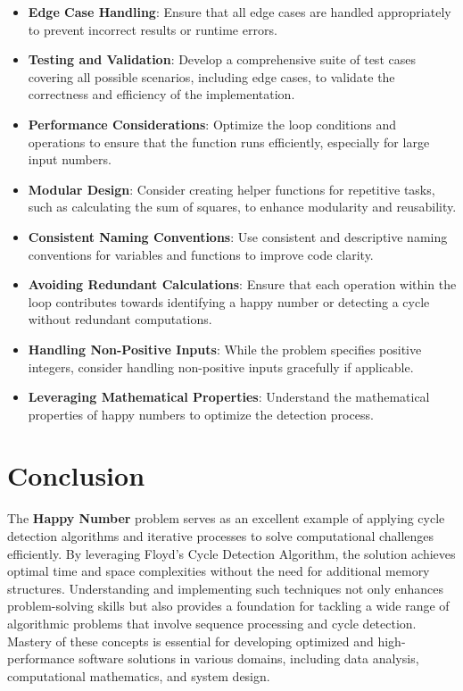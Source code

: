 \begin{itemize}
    \item \textbf{Edge Case Handling}: Ensure that all edge cases are handled appropriately to prevent incorrect results or runtime errors.
    
    \item \textbf{Testing and Validation}: Develop a comprehensive suite of test cases covering all possible scenarios, including edge cases, to validate the correctness and efficiency of the implementation.
    
    \item \textbf{Performance Considerations}: Optimize the loop conditions and operations to ensure that the function runs efficiently, especially for large input numbers.
    
    \item \textbf{Modular Design}: Consider creating helper functions for repetitive tasks, such as calculating the sum of squares, to enhance modularity and reusability.
    
    \item \textbf{Consistent Naming Conventions}: Use consistent and descriptive naming conventions for variables and functions to improve code clarity.
    
    \item \textbf{Avoiding Redundant Calculations}: Ensure that each operation within the loop contributes towards identifying a happy number or detecting a cycle without redundant computations.
    
    \item \textbf{Handling Non-Positive Inputs}: While the problem specifies positive integers, consider handling non-positive inputs gracefully if applicable.
    
    \item \textbf{Leveraging Mathematical Properties}: Understand the mathematical properties of happy numbers to optimize the detection process.
\end{itemize}

\section*{Conclusion}

The \textbf{Happy Number} problem serves as an excellent example of applying cycle detection algorithms and iterative processes to solve computational challenges efficiently. By leveraging Floyd's Cycle Detection Algorithm, the solution achieves optimal time and space complexities without the need for additional memory structures. Understanding and implementing such techniques not only enhances problem-solving skills but also provides a foundation for tackling a wide range of algorithmic problems that involve sequence processing and cycle detection. Mastery of these concepts is essential for developing optimized and high-performance software solutions in various domains, including data analysis, computational mathematics, and system design.

\printindex

% 
% 
% 
% 
% 